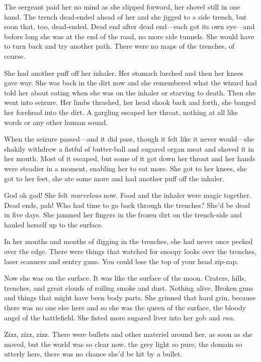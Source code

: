 The sergeant paid her no mind as she slipped forward, her shovel
still in one hand. The trench dead-ended ahead of her and she
jigged to a side trench, but soon that, too, dead-ended. Dead end
after dead end—each got its own eye—and before long she was at the
end of the road, no more side tunnels. She would have to turn back
and try another path. There were no maps of the trenches, of
course.

She had another puff off her inhaler. Her stomach lurched and then
her knees gave way. She was back in the dirt now and she remembered
what the wizard had told her about eating when she was on the
inhaler or starving to death. Then she went into seizure. Her limbs
thrashed, her head shook back and forth, she banged her forehead
into the dirt. A gargling escaped her throat, nothing at all like
words or any other human sound.

When the seizure passed—and it did pass, though it felt like it
never would—she shakily withdrew a fistful of butter-ball and
sugared organ meat and shoved it in her mouth. Most of it escaped,
but some of it got down her throat and her hands were steadier in a
moment, enabling her to eat more. She got to her knees, she got to
her feet, she ate some more and had another puff off the inhaler.

God oh god! She felt \emph{marvelous} now. Food and the inhaler
were magic together. Dead ends, pah! Who had time to go back
through the trenches? She’d be dead in five days. She jammed her
fingers in the frozen dirt on the trench-side and hauled herself up
to the surface.

In her months and months of digging in the trenches, she had never
once peeked over the edge. There were things that watched for
snoopy looks over the trenches, laser scanners and sentry guns. You
could lose the top of your head zip-zap.

Now she was on the surface. It was like the surface of the moon.
Craters, hills, trenches, and great clouds of roiling smoke and
dust. Nothing alive. Broken guns and things that might have been
body parts. She grinned that hard grin, because there was no one
else here and so she was the queen of the surface, the bloody angel
of the battlefield. She fisted more sugared liver into her gob and
\emph{ran}.

Zizz, zizz, zizz. There were bullets and other materiel around her,
as soon as she moved, but the world was so clear now, the grey
light so pure, the domain so utterly hers, there was no chance
she’d be hit by a bullet.

